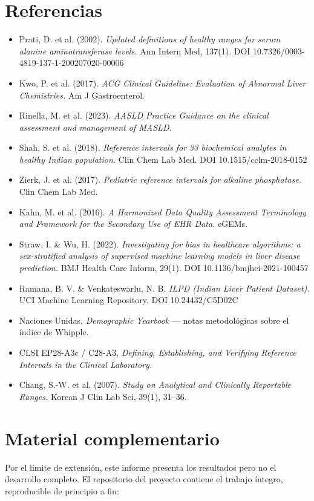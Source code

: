 \documentclass[10pt,a4paper]{article}
\begin{document}
\section*{Referencias}
\small
\begin{itemize}
\item Prati, D. et al. (2002). \textit{Updated definitions of healthy ranges for serum alanine aminotransferase levels.} Ann Intern Med, 137(1). DOI 10.7326/0003-4819-137-1-200207020-00006
\item Kwo, P. et al. (2017). \textit{ACG Clinical Guideline: Evaluation of Abnormal Liver Chemistries.} Am J Gastroenterol.
\item Rinella, M. et al. (2023). \textit{AASLD Practice Guidance on the clinical assessment and management of MASLD.}
\item Shah, S. et al. (2018). \textit{Reference intervals for 33 biochemical analytes in healthy Indian population.} Clin Chem Lab Med. DOI 10.1515/cclm-2018-0152
\item Zierk, J. et al. (2017). \textit{Pediatric reference intervals for alkaline phosphatase.} Clin Chem Lab Med.
\item Kahn, M. et al. (2016). \textit{A Harmonized Data Quality Assessment Terminology and Framework for the Secondary Use of EHR Data.} eGEMs.
\item Straw, I. \& Wu, H. (2022). \textit{Investigating for bias in healthcare algorithms: a sex-stratified analysis of supervised machine learning models in liver disease prediction.} BMJ Health Care Inform, 29(1). DOI 10.1136/bmjhci-2021-100457
\item Ramana, B. V. \& Venkateswarlu, N. B. \textit{ILPD (Indian Liver Patient Dataset).} UCI Machine Learning Repository. DOI 10.24432/C5D02C
\item Naciones Unidas, \textit{Demographic Yearbook} --- notas metodológicas sobre el índice de Whipple.
\item CLSI EP28-A3c / C28-A3, \textit{Defining, Establishing, and Verifying Reference Intervals in the Clinical Laboratory.}
\item Chang, S.-W. et al. (2007). \textit{Study on Analytical and Clinically Reportable Ranges.} Korean J Clin Lab Sci, 39(1), 31--36.
\end{itemize}

\vspace{0.4em}
\section*{Material complementario}
\normalsize
Por el límite de extensión, este informe presenta los resultados pero no el
desarrollo completo. El repositorio del proyecto contiene el trabajo íntegro,
reproducible de principio a fin:
\end{document}
